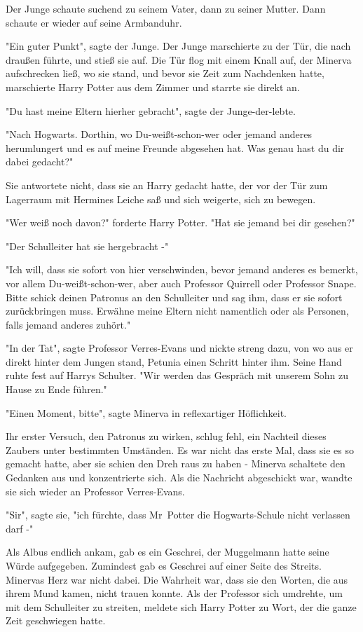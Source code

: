 {Der Junge schaute suchend zu seinem Vater, dann zu seiner Mutter. Dann schaute er wieder auf seine Armbanduhr.

"Ein guter Punkt", sagte der Junge. Der Junge marschierte zu der Tür, die nach draußen führte, und stieß sie auf. Die Tür flog mit einem Knall auf, der Minerva aufschrecken ließ, wo sie stand, und bevor sie Zeit zum Nachdenken hatte, marschierte Harry Potter aus dem Zimmer und starrte sie direkt an.

"Du hast meine Eltern hierher gebracht", sagte der Junge-der-lebte.

"Nach Hogwarts. Dorthin, wo Du-weißt-schon-wer oder jemand anderes herumlungert und es auf meine Freunde abgesehen hat. Was genau hast du dir dabei gedacht?"

Sie antwortete nicht, dass sie an Harry gedacht hatte, der vor der Tür zum Lagerraum mit Hermines Leiche saß und sich weigerte, sich zu bewegen.

"Wer weiß noch davon?" forderte Harry Potter. "Hat sie jemand bei dir gesehen?"

"Der Schulleiter hat sie hergebracht -"

"Ich will, dass sie sofort von hier verschwinden, bevor jemand anderes es bemerkt, vor allem Du-weißt-schon-wer, aber auch Professor Quirrell oder Professor Snape. Bitte schick deinen Patronus an den Schulleiter und sag ihm, dass er sie sofort zurückbringen muss. Erwähne meine Eltern nicht namentlich oder als Personen, falls jemand anderes zuhört."

"In der Tat", sagte Professor Verres-Evans und nickte streng dazu, von wo aus er direkt hinter dem Jungen stand, Petunia einen Schritt hinter ihm. Seine Hand ruhte fest auf Harrys Schulter. "Wir werden das Gespräch mit unserem Sohn zu Hause zu Ende führen."

"Einen Moment, bitte", sagte Minerva in reflexartiger Höflichkeit.

Ihr erster Versuch, den Patronus zu wirken, schlug fehl, ein Nachteil dieses Zaubers unter bestimmten Umständen. Es war nicht das erste Mal, dass sie es so gemacht hatte, aber sie schien den Dreh raus zu haben - Minerva schaltete den Gedanken aus und konzentrierte sich. Als die Nachricht abgeschickt war, wandte sie sich wieder an Professor Verres-Evans.

"Sir", sagte sie, "ich fürchte, dass Mr~Potter die Hogwarts-Schule nicht verlassen darf -"

Als Albus endlich ankam, gab es ein Geschrei, der Muggelmann hatte seine Würde aufgegeben. Zumindest gab es Geschrei auf einer Seite des Streits. Minervas Herz war nicht dabei. Die Wahrheit war, dass sie den Worten, die aus ihrem Mund kamen, nicht trauen konnte. Als der Professor sich umdrehte, um mit dem Schulleiter zu streiten, meldete sich Harry Potter zu Wort, der die ganze Zeit geschwiegen hatte.

}
